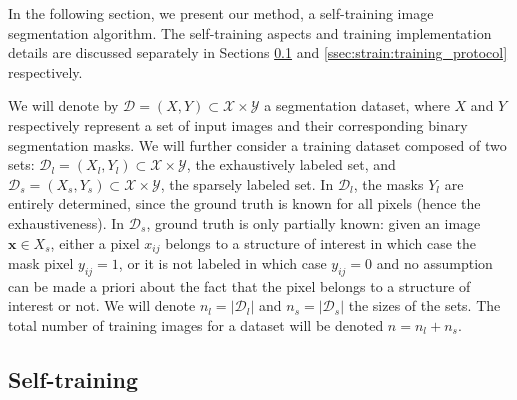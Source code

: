 In the following section, we present our method, a self-training image segmentation algorithm. The self-training aspects and training implementation details are discussed separately in Sections \ref{ssec:strain:self_training} and \ref{ssec:strain:training_protocol} respectively.

We will denote by  $\mathcal{D} = \left(X, Y\right) \subset \mathcal{X} \times \mathcal{Y}$ a segmentation dataset, where $X$ and $Y$ respectively represent a set of input images and their corresponding binary segmentation masks. We will further consider a training dataset composed of two sets: $\mathcal{D}_l = \left(X_l, Y_l\right) \subset \mathcal{X} \times \mathcal{Y}$, the exhaustively labeled set, and $\mathcal{D}_s = \left(X_s, Y_s\right) \subset \mathcal{X} \times \mathcal{Y}$, the sparsely labeled set. In $\mathcal{D}_l$, the masks $Y_l$ are entirely determined, since the ground truth is known for all pixels (hence the exhaustiveness). In $\mathcal{D}_s$, ground truth is only partially known: given an image $\mathbf{x} \in X_s$, either a pixel $x_{ij}$ belongs to a structure of interest in which case the mask pixel $y_{ij} = 1$, or it is not labeled in which case $y_{ij} = 0$ and no assumption can be made a priori about the fact that the pixel belongs to a structure of interest or not. We will denote $n_l = |\mathcal{D}_l|$ and $n_s = |\mathcal{D}_s|$ the sizes of the sets. The total number of training images for a dataset will be denoted $n = n_l + n_s$.


\subsection{Self-training}
\label{ssec:strain:self_training}
 
